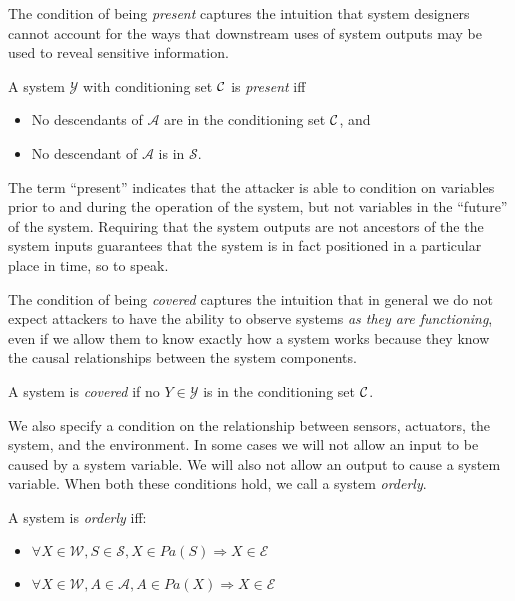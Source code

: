 \documentclass[../thesis.tex]{subfiles}
\begin{document}
The condition of being \emph{present} captures the
intuition that system designers cannot account for
the ways that downstream uses of system outputs
may be used to reveal sensitive information.

\begin{dfn}[Present]
  A system $\mathcal{Y}$ with conditioning set $\mathcal{C}$ is \emph{present}
   iff
  \begin{itemize}
  \item No descendants of $\mathcal{A}$ are in the
    conditioning set $\mathcal{C}$, and
  \item No descendant of $\mathcal{A}$ is in
    $\mathcal{S}$.
  \end{itemize}
\end{dfn}

The term ``present'' indicates that the attacker
is able to condition on variables prior to and
during the operation of the system, but not
variables in the ``future'' of the system.
Requiring that the system outputs are not ancestors of
the the system inputs guarantees that the system is
in fact positioned in a particular place in time,
so to speak.

The condition of being \emph{covered} captures the intuition
that in general we do not expect attackers to have
the ability to observe systems 
\emph{as they are functioning}, even if we allow them
to know exactly how a system works because
they know the causal relationships between the
system components.

\begin{dfn}[Covered]
  \label{def:covered-system}
  A system is \emph{covered} if no $Y \in \mathcal{Y}$
  is in the conditioning set $\mathcal{C}$.
\end{dfn}

%
%

We also specify a condition on the relationship
between sensors, actuators, the system, and the environment.
In some cases we will not allow an input to be caused
by a system variable.
We will also not allow an output to cause a system variable.
When both these conditions hold, we call a system \emph{orderly}.

\begin{dfn}[Orderly]
  \label{def:orderly-system}
  A system is \emph{orderly} iff:
  \begin{itemize}
  \item $\forall X \in \mathcal{W}, S \in \mathcal{S}, X \in Pa(S) \Longrightarrow X \in \mathcal{E}$
  \item $\forall X \in \mathcal{W}, A \in \mathcal{A}, A \in Pa(X) \Longrightarrow X \in \mathcal{E}$
  \end{itemize}
\end{dfn}
\end{document}
